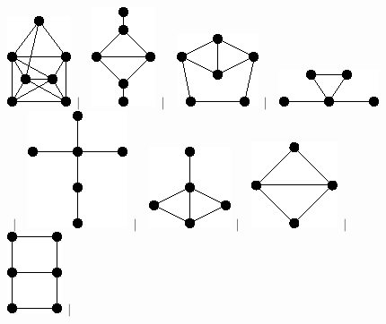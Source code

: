 \documentclass[11pt,paper=b5,footinclude,headinclude]{scrbook} %
\newtheorem{ex}{Vaja\hypertarget{sol:\theex}}[chapter]
\begin{document}
\begin{ex}
\begin{figure}
\includegraphics[scale=0.5]{smallGraphs/g_co-skewstar.png}$\,\mid\,$\
\includegraphics[scale=0.5]{smallGraphs/g_co-twin-house.png}$\,\mid\,$\
\includegraphics[scale=0.5]{smallGraphs/g_co-twinC5.png}$\,\mid\,$\
\includegraphics[scale=0.5]{smallGraphs/g_cricket.png}$\,\mid\,$\
\includegraphics[scale=0.5]{smallGraphs/g_cross.png}$\,\mid\,$\
\includegraphics[scale=0.5]{smallGraphs/g_dart.png}$\,\mid\,$\
\includegraphics[scale=0.5]{smallGraphs/g_diamond.png}$\,\mid\,$\
\includegraphics[scale=0.5]{smallGraphs/g_domino.png}$\,\mid\,$\

\end{figure}
\end{ex}
\end{document}

